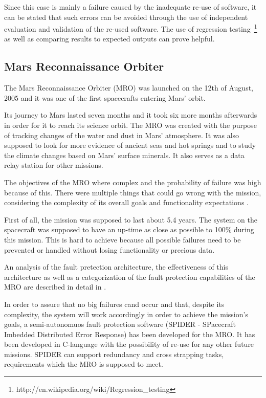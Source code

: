 Since this case is mainly a failure caused by the inadequate re-use of
software, it can be stated that such errors can be avoided through the use of
independent evaluation and validation of the re-used software. The use of
regression testing~\footnote{http://en.wikipedia.org/wiki/Regression\_testing}
as well as comparing results to expected outputs can prove helpful.
\subsection{Mars Reconnaissance Orbiter}

The Mars Reconnaissance Orbiter (MRO)\cite{mro-nasa} was launched on the 12th of
August, 2005 and it was one of the first spacecrafts entering Mars' orbit.

Its journey to Mars lasted seven months and it took six more months afterwards
in order for it to reach its science orbit. The MRO was created with the purpose
of tracking changes of the water and dust in Mars' atmosphere. It was also
supposed to look for more evidence of ancient seas and hot springs and to study
the climate changes based on Mars' surface minerals. It also serves as a data
relay station for other missions.

The objectives of the MRO where complex and the probability of failure was high
because of this. There were multiple things that could go wrong with the
mission, considering the complexity of its overall goals and functionality
expectations \cite{tvs}.

First of all, the mission was supposed to last about 5.4 years. The system on
the spacecraft was supposed to have an up-time as close as possible to 100\%
during this mission. This is hard to achieve because all possible failures need
to be prevented or handled without losing functionality or precious data.

An analysis of the fault pretection architecture, the effectiveness of this
architecture as well as a categorization of the fault protection capabilities of
the MRO are described in detail in \cite{surv-nasa-mars}.

In order to assure that no big failures cand occur and that, despite its
complexity, the system will work accordingly in order to achieve the mission's
goals, a semi-autonomuos fault protection software (SPIDER - SPacecraft Imbedded
Distributed Error Response) has been developed for the MRO. It has been
developed in C-language with the possibility of re-use for any other future
missions. SPIDER can support redundancy and cross strapping tasks, requirements
which the MRO is supposed to meet.

